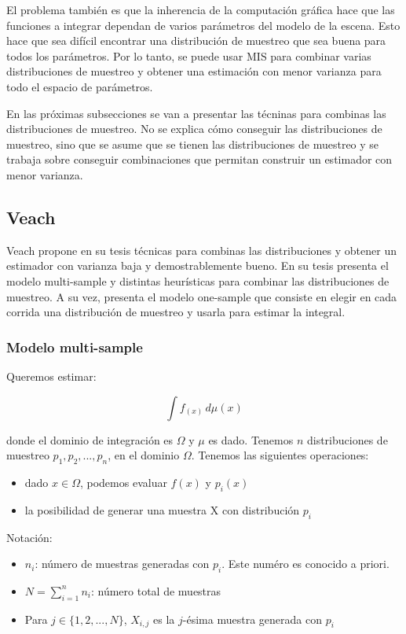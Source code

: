 \documentclass{article}
\begin{document}
El problema también es que la inherencia de la computación gráfica hace que las funciones a integrar dependan de varios parámetros del modelo de la escena.
Esto hace que sea difícil encontrar una distribución de muestreo que sea buena para todos los parámetros.
Por lo tanto, se puede usar MIS para combinar varias distribuciones de muestreo y obtener una estimación con menor varianza para todo el espacio de parámetros.

En las próximas subsecciones se van a presentar las técninas para combinas las distribuciones de muestreo.
No se explica cómo conseguir las distribuciones de muestreo, sino que se asume que se tienen las distribuciones de muestreo y se trabaja sobre conseguir combinaciones que permitan construir un estimador con menor varianza.

\subsection{Veach}

Veach propone en su tesis técnicas para combinas las distribuciones y obtener un estimador con varianza baja y demostrablemente bueno.
En su tesis presenta el modelo multi-sample y distintas heurísticas para combinar las distribuciones de muestreo.
A su vez, presenta el modelo one-sample que consiste en elegir en cada corrida una distribución de muestreo y usarla para estimar la integral.

\subsubsection{Modelo multi-sample}

Queremos estimar:

$$ \int f_(x) \,d\mu(x)$$

donde el dominio de integración es $\Omega$ y $\mu$ es dado. Tenemos $n$ distribuciones de muestreo $p_{1}, p_{2}, ..., p_{n}$, en el dominio $\Omega$.
Tenemos las siguientes operaciones:
\begin{itemize}
    \item dado $x \in \Omega$, podemos evaluar $f(x)$ y $p_{i}(x)$
    \item la posibilidad de generar una muestra X con distribución $p_{i}$
\end{itemize}

Notación:
\begin{itemize}
    \item $n_{i}$: número de muestras generadas con $p_{i}$. Este numéro es conocido a priori.
    \item $N = \sum_{i=1}^{n} n_{i}$: número total de muestras
    \item Para $j \in \{1, 2, ..., N\}$, $X_{i,j}$ es la $j$-ésima muestra generada con $p_{i}$
\end{itemize}
\end{document}
